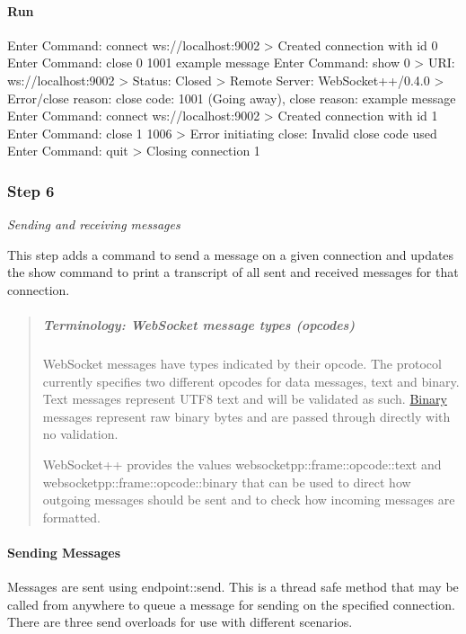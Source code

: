 \paragraph*{Run}


\begin{DoxyCode}
Enter Command: connect ws://localhost:9002
> Created connection with id 0
Enter Command: close 0 1001 example message
Enter Command: show 0
> URI: ws://localhost:9002
> Status: Closed
> Remote Server: WebSocket++/0.4.0
> Error/close reason: close code: 1001 (Going away), close reason:  example message
Enter Command: connect ws://localhost:9002
> Created connection with id 1
Enter Command: close 1 1006
> Error initiating close: Invalid close code used
Enter Command: quit
> Closing connection 1
\end{DoxyCode}


\subsubsection*{Step 6}

{\itshape Sending and receiving messages}

This step adds a command to send a message on a given connection and updates the show command to print a transcript of all sent and received messages for that connection.

\begin{quote}
\subparagraph*{Terminology\+: Web\+Socket message types (opcodes)}

Web\+Socket messages have types indicated by their opcode. The protocol currently specifies two different opcodes for data messages, text and binary. Text messages represent U\+T\+F8 text and will be validated as such. \mbox{\hyperlink{struct_binary}{Binary}} messages represent raw binary bytes and are passed through directly with no validation.

Web\+Socket++ provides the values {\ttfamily websocketpp\+::frame\+::opcode\+::text} and {\ttfamily websocketpp\+::frame\+::opcode\+::binary} that can be used to direct how outgoing messages should be sent and to check how incoming messages are formatted. \end{quote}


\paragraph*{Sending Messages}

Messages are sent using {\ttfamily endpoint\+::send}. This is a thread safe method that may be called from anywhere to queue a message for sending on the specified connection. There are three send overloads for use with different scenarios.


